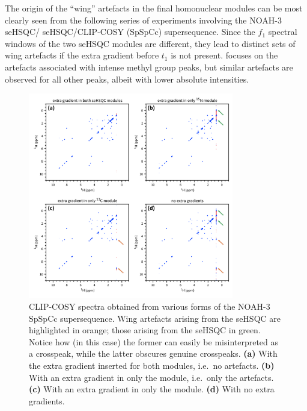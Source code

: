 The origin of the ``wing'' artefacts in the final homonuclear modules can be most clearly seen from the following series of experiments involving the NOAH-3 \nitrogen{} seHSQC/\carbon{} seHSQC/CLIP-COSY (SpSpCc) supersequence.
Since the $f_1$ spectral windows of the two seHSQC modules are different, they lead to distinct sets of wing artefacts if the extra gradient before $t_1$ is not present.
 focuses on the artefacts associated with intense methyl group peaks, but similar artefacts are observed for all other peaks, albeit with lower absolute intensities.

\begin{figure}
    \centering
    \includegraphics[width=0.8\textwidth]{./figures/wing_artefacts.png}
    \caption{
        CLIP-COSY spectra obtained from various forms of the NOAH-3 SpSpCc supersequence.
        Wing artefacts arising from the \nitrogen{} seHSQC are highlighted in orange; those arising from the \carbon{} seHSQC in green.
        Notice how (in this case) the former can easily be misinterpreted as a crosspeak, while the latter obscures genuine crosspeaks.
        \grami{}
        \textbf{(a)} With the extra gradient inserted for both modules, i.e.\ no artefacts.
        \textbf{(b)} With an extra gradient in only the \nitrogen{} module, i.e.\ only the \carbon{} artefacts.
        \textbf{(c)} With an extra gradient in only the \carbon{} module.
        \textbf{(d)} With no extra gradients.
    }
    \label{fig:wing_artefacts}
\end{figure}


